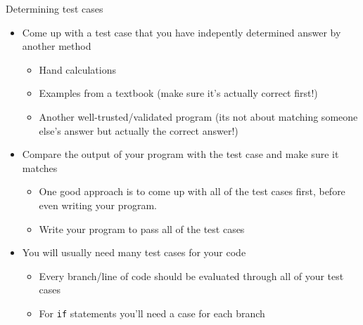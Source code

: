 \documentclass[11pt,professionalfonts]{beamer}
\begin{document}
\begin{frame}{Determining test cases}
    \begin{itemize}
        \item Come up with a test case that you have indepently determined answer by another method
            \begin{itemize}
                \item Hand calculations
                \item Examples from a textbook (make sure it's actually correct first!)
                \item Another well-trusted/validated program (its not about matching someone else's answer but actually the correct answer!)
            \end{itemize}
        \item Compare the output of your program with the test case and make sure it matches
            \begin{itemize}
                \item One good approach is to come up with all of the test cases first, before even writing your program.
                \item Write your program to pass all of the test cases
            \end{itemize}
        \item You will usually need many test cases for your code
            \begin{itemize}
                \item Every branch/line of code should be evaluated through all of your test cases
                \item For \texttt{if} statements you'll need a case for each branch
            \end{itemize}
    \end{itemize}
\end{frame}
\end{document}
